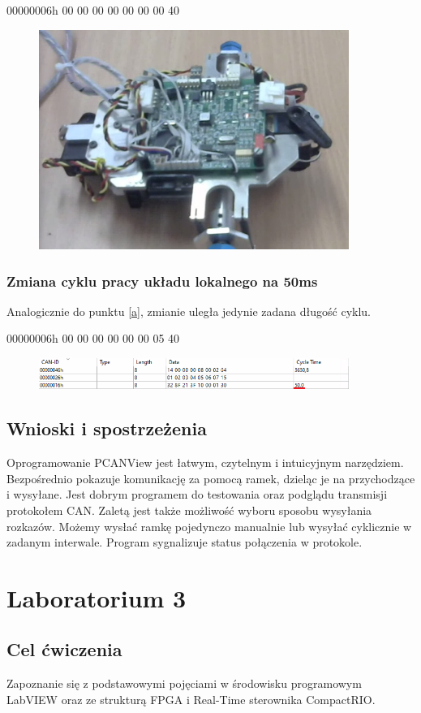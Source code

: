 \documentclass[margin = 2cm]{article}
\begin{document}
	00000006h	00 00 00 00 00 00 00 40
	\begin{figure}[H]
		\centering
		\includegraphics[width=0.9\textwidth]{min}
	\end{figure}
	\subsubsection{Zmiana cyklu pracy układu lokalnego na 50ms}
	Analogicznie do punktu \ref{a}, zmianie uległa jedynie zadana długość cyklu.
	
	00000006h	00 00 00 00 00 00 05 40
	\begin{figure}[H]
		\centering
		\includegraphics[width=0.9\textwidth]{50ms}
	\end{figure}
	\subsection{Wnioski i spostrzeżenia}
	Oprogramowanie PCANView jest łatwym, czytelnym i intuicyjnym narzędziem. Bezpośrednio pokazuje komunikację za pomocą ramek, dzieląc je na przychodzące i wysyłane. Jest dobrym programem do testowania oraz podglądu transmisji protokołem CAN. Zaletą jest także możliwość wyboru sposobu wysyłania rozkazów. Możemy wysłać ramkę pojedynczo manualnie lub wysyłać cyklicznie w zadanym interwale. Program sygnalizuje status połączenia w protokole. 
\section{Laboratorium 3}
	\subsection{Cel ćwiczenia}
Zapoznanie się z podstawowymi pojęciami w środowisku programowym LabVIEW oraz ze strukturą FPGA i Real-Time sterownika CompactRIO.
\end{document}
